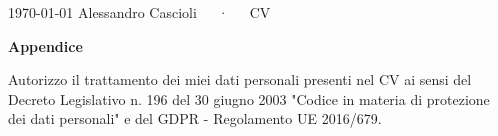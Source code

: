 \documentclass[11pt, a4paper]{awesome-cv}
\begin{document}
\makecvheader[C]

\makecvfooter
{\today}
{Alessandro Cascioli~~~·~~~CV}
{\thepage}


% 

\newpage






\newpage
{}
{\fontsize{24pt}{1em}\selectfont\bfseries\color{darktext} Appendice}







\vfill %

\begin{cvparagraph}
  Autorizzo il trattamento dei miei dati personali presenti nel CV ai sensi del Decreto Legislativo n. 196 del 30 giugno 2003 "Codice in materia di protezione dei dati personali" e del GDPR - Regolamento UE 2016/679.
  \vspace{1cm}
\end{cvparagraph}


\end{document}
